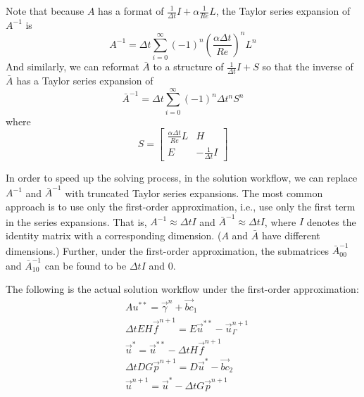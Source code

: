 Note that because $A$ has a format of $\frac{1}{\Delta t}I + \alpha \frac{1}{Re}L$, the Taylor series expansion of $A^{-1}$ is
\begin{equation}\label{eq:approx-A-inv}
    A^{-1} = \Delta t \sum\limits_{i=0}^{\infty} \left(-1\right)^{n}\left(\frac{\alpha\Delta t}{Re}\right)^n L^n
\end{equation}
And similarly, we can reformat $\bar{A}$ to a structure of $\frac{1}{\Delta t}I + S$ so that the inverse of $\bar{A}$ has a Taylor series expansion of
\begin{equation}\label{eq:approx-A-bar-inv}
    \bar{A}^{-1} = \Delta t \sum\limits_{i=0}^{\infty}\left(-1\right)^{n}\Delta t^n S^n
\end{equation}
where
\begin{equation}
    S = \begin{bmatrix}
        \frac{\alpha \Delta t}{Re}L & H \\
        E & -\frac{1}{\Delta t}I
    \end{bmatrix}
\end{equation}

In order to speed up the solving process, in the solution workflow, we can replace $A^{-1}$ and $\bar{A}^{-1}$ with truncated Taylor series expansions.
The most common approach is to use only the first-order approximation, i.e., use only the first term in the series expansions.
That is, $A^{-1} \approx \Delta t I$ and $\bar{A}^{-1} \approx \Delta t I$, where $I$ denotes the identity matrix with a corresponding dimension. ($A$ and $\bar{A}$ have different dimensions.)
Further, under the first-order approximation, the submatrices $\bar{A}_{00}^{-1}$ and $\bar{A}_{10}^{-1}$ can be found to be $\Delta t I$ and $0$.

The following is the actual solution workflow under the first-order approximation:
\begin{subequations}\label{eq:dibpm-first-order}
    \begin{align}
        & A u^{* *} = \vec{\gamma}^n + \vec{bc}_1\label{eq:dibpm-order2-1} \\
        & \Delta t EH \vec{f}^{n+1} = E \vec{u}^{* *} - \vec{u}_\Gamma^{n+1}\label{eq:dibpm-order2-2} \\
        & \vec{u}^* = \vec{u}^{* *} - \Delta t H \vec{f}^{n+1}\label{eq:dibpm-order2-3}\\
        & \Delta t DG \vec{p}^{n+1} = D \vec{u}^* - \vec{bc}_2\label{eq:dibpm-order2-4} \\
        & \vec{u}^{n+1} = \vec{u}^* - \Delta t G \vec{p}^{n+1}\label{eq:dibpm-order2-5}
    \end{align}
\end{subequations}

